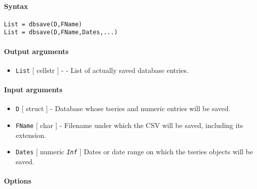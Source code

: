 


	\paragraph{Syntax}

\begin{verbatim}
List = dbsave(D,FName)
List = dbsave(D,FName,Dates,...)
\end{verbatim}

\paragraph{Output arguments}

\begin{itemize}
\itemsep1pt\parskip0pt
\item
  \texttt{List} {[} cellstr {]} - - List of actually saved database
  entries.
\end{itemize}

\paragraph{Input arguments}

\begin{itemize}
\item
  \texttt{D} {[} struct {]} - Database whose tseries and numeric entries
  will be saved.
\item
  \texttt{FName} {[} char {]} - Filename under which the CSV will be
  saved, including its extension.
\item
  \texttt{Dates} {[} numeric \textbar{} \emph{\texttt{Inf}} {]} Dates or
  date range on which the tseries objects will be saved.
\end{itemize}

\paragraph{Options}

